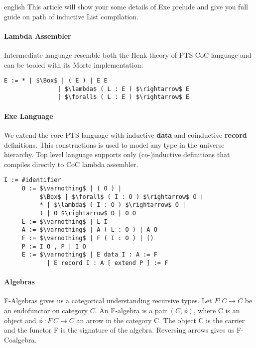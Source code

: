 \documentclass{abstract}
\begin{document}
\begin{theses}{english}
This article will show your some details of Exe prelude and give you full guide on path of inductive List compilation.

\paragraph{Lambda Assembler}

Intermediate language resemble both the Henk\cite{Henk} theory of PTS CoC language
and can be tooled with its Morte\cite{morte} implementation:

\begin{lstlisting}[mathescape=true]
    E := * | $\Box$ | ( E ) | E E 
               | $\lambda$ ( L : E ) $\rightarrow$ E 
               | $\forall$ ( L : E ) $\rightarrow$ E
\end{lstlisting}

\paragraph{Exe Language}

We extend the core PTS language with inductive {\bf data} and coinductive {\bf record} definitions.
This constructions is used to model any type in the universe hierarchy. Top level language supports
only (co-)inductive definitions that compiles directly to CoC lambda assembler.

\vspace{0.5cm}
\begin{lstlisting}[mathescape=true]
     I := #identifier
     O := $\varnothing$ | ( O ) |
          $\Box$ | $\forall$ ( I : O ) $\rightarrow$ O |
          * | $\lambda$ ( I : O ) $\rightarrow$ O |
          I | O $\rightarrow$ O | O O
     L := $\varnothing$ | L I
     A := $\varnothing$ | A ( L : O ) | A O
     F := $\varnothing$ | F ( I : O ) | ()
     P := I O , P | I O
     E := $\varnothing$ | E data I : A := F
            | E record I : A [ extend P ] := F
\end{lstlisting}

   \paragraph{Algebras}

   F-Algebras gives us a categorical understanding recursive types.
   Let $F : C \rightarrow C$ be an endofunctor on category $C$.
   An F-algebra is a pair $(C, \phi)$, where C is an object and $\phi\ : F\ C \rightarrow C$
   an arrow in the category C. The object C is the carrier and the functor
   F is the signature of the algebra. Reversing arrows gives us F-Coalgebra.


\end{theses}
\end{document}
